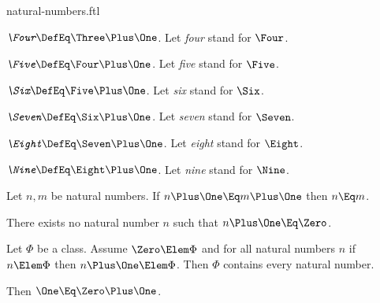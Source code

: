 \documentclass{stex}
\begin{document}
\begin{smodule}{natural-numbers.ftl}
\begin{definition*}[forthel,for=four]
  $\emph{\Four} \DefEq \Three \Plus \One$.
  Let \emph{four} stand for $\Four$.
\end{definition*}

\begin{definition*}[forthel,for=five]
  $\emph{\Five} \DefEq \Four \Plus \One$.
  Let \emph{five} stand for $\Five$.
\end{definition*}

\begin{definition*}[forthel,for=six]
  $\emph{\Six} \DefEq \Five \Plus \One$.
  Let \emph{six} stand for $\Six$.
\end{definition*}

\begin{definition*}[forthel,for=seven]
  $\emph{\Seven} \DefEq \Six \Plus \One$.
  Let \emph{seven} stand for $\Seven$.
\end{definition*}

\begin{definition*}[forthel,for=eight]
  $\emph{\Eight} \DefEq \Seven \Plus \One$.
  Let \emph{eight} stand for $\Eight$.
\end{definition*}

\begin{definition*}[forthel,for=nine]
  $\emph{\Nine} \DefEq \Eight \Plus \One$.
  Let \emph{nine} stand for $\Nine$.
\end{definition*}

\begin{axiom*}[forthel,name=injectivity of successor function]
  Let $n, m$ be natural numbers.
  If $n \Plus \One \Eq m \Plus \One$ then $n \Eq m$.
\end{axiom*}

\begin{axiom*}[forthel]
  There exists no natural number $n$ such that $n \Plus \One \Eq \Zero$.
\end{axiom*}

\begin{axiom*}[forthel,title=Induction,name=induction I]
  Let $\Phi$ be a class.
  Assume $\Zero \Elem \Phi$ and for all natural numbers $n$ if $n \Elem \Phi$ then
  $n \Plus \One \Elem \Phi$.
  Then $\Phi$ contains every natural number.
\end{axiom*}

\begin{axiom*}[forthel]
  Then $\One \Eq \Zero \Plus \One$.
\end{axiom*}


\end{smodule}
\end{document}
